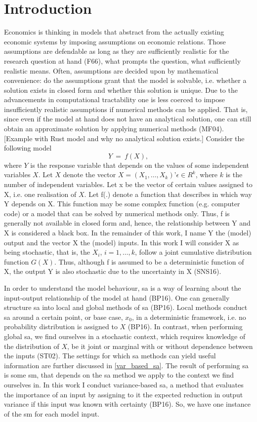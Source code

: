 \section{Introduction} \label{intro}

Economics is thinking in models that abstract from the actually existing economic systems by imposing assumptions on economic relations. Those assumptions are defendable as long as they are sufficiently realistic for the research question at hand (F66), what prompts the question, what sufficiently realistic means. Often, assumptions are decided upon by mathematical convenience: do the assumptions grant that the model is solvable, i.e. whether a solution exists in closed form and whether this solution is unique.
Due to the advancements in computational tractability one is less coerced to impose insufficiently realistic assumptions if numerical methods can be applied. That is, since even if the model at hand does not have an analytical solution, one can still obtain an approximate solution by applying numerical methods (MF04). [Example with Rust model and why no analytical solution exists.]
Consider the following model
$$Y\ =\ f(X),$$
where $Y$ is the response variable that depends on the values of some independent variables $X$. Let $X$ denote the vector $X = (X_1, …, X_k)’ \epsilon \in R^k$, where $k$ is the number of independent variables. Let x be the vector of certain values assigned to X, i.e. one realisation of $X$. Let f(.) denote a function that describes in which way Y depends on X. This function may be some complex function (e.g. computer code) or a model that can be solved by numerical methods only. Thus, f is generally not available in closed form and, hence, the relationship between Y and X is considered a black box.
In the remainder of this work, I name Y the (model) output and the vector X the (model) inputs. In this work I will consider X as being stochastic, that is, the $X_i$, $i = 1, …, k$, follow a joint cumulative distribution function $G(X)$. Thus, although f is assumed to be a deterministic function of X, the output Y is also stochastic due to the uncertainty in X (SNS16).

In order to understand the model behaviour, sa is a way of learning about the input-output relationship of the model at hand (BP16). One can generally structure sa into local and global methods of sa (BP16). Local methods conduct sa around a certain point, or base case, $x_0$, in a deterministic framework, i.e. no probability distribution is assigned to $X$ (BP16). In contrast, when performing global sa, we find ourselves in a stochastic context, which requires knowledge of the distribution of $X$, be it joint or marginal with or without dependence between the inputs (ST02).
The settings for which sa methods can yield useful information are further discussed in \ref{var_based_sa}. The result of performing sa is some sm, that depends on the sa method we apply to the context we find ourselves in. In this work I conduct variance-based sa, a method that evaluates the importance of an input by assigning to it the expected reduction in output variance if this input was known with certainty (BP16). So, we have one instance of the sm for each model input.

